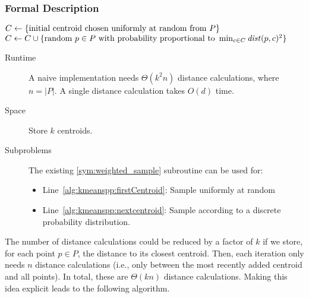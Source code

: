 \subsubsection{Formal Description}

\begin{algorithm} \label{alg:kmeans++}
\begin{algorithmic}[1]
		\State $C \leftarrow \{ \text{initial centroid chosen uniformly at random from } P \}$ \label{alg:kmeanspp:firstCentroid}
	\EndIf
	 \label{alg:kmeans++:for}
		\State $C \leftarrow C \cup \{ \text{random $p \in P$ with probability proportional to }\min_{c \in C} \mathit{dist}(p,c)^2 \}$ \label{alg:kmeanspp:nextcentroid}
	\EndWhile
\end{algorithmic}
\end{algorithm}

\begin{description}
	\item[Runtime] A naive implementation needs $\Theta(k^2 n)$ distance calculations, where $n = |P|$. A single distance calculation takes $O(d)$ time.
	\item[Space] Store $k$ centroids.
	\item[Subproblems]
		The existing \ref{sym:weighted_sample} subroutine can be used for:
		\begin{itemize}
			\item Line~\ref{alg:kmeanspp:firstCentroid}: Sample uniformly at random
			\item Line~\ref{alg:kmeanspp:nextcentroid}: Sample according to a discrete probability distribution.
		\end{itemize}
\end{description}

The number of distance calculations could be reduced by a factor of $k$ if we store, for each point $p \in P$, the distance to its closest centroid. Then, each iteration only needs $n$ distance calculations (i.e., only between the most recently added centroid and all points). In total, these are $\Theta(k n)$ distance calculations. Making this idea explicit leads to the following algorithm.

